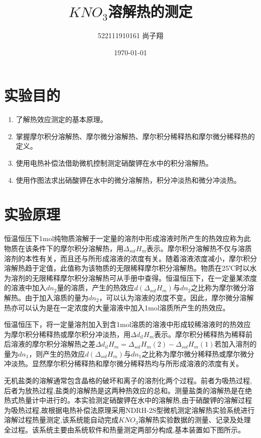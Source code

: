 \documentclass[UTF8]{ctexart}
\title{$KNO_3$溶解热的测定}
\author{522111910161 尚子翔}
\date{\today}
\begin{document}
\fancyhead[L]{}
\fancyfoot[R]{\thepage}

\maketitle
\tableofcontents
\newpage

\section{实验目的}
\begin{enumerate}
    \item 了解热效应测定的基本原理。 
    \item 掌握摩尔积分溶解热、摩尔微分溶解热、摩尔积分稀释热和摩尔微分稀释热的定义。
    \item 使用电热补偿法借助微机控制测定硝酸钾在水中的积分溶解热。
    \item 使用作图法求出硝酸钾在水中的微分溶解热，积分冲淡热和微分冲淡热。
\end{enumerate}



\section{实验原理}
恒温恒压下1mol纯物质溶解于一定量的溶剂中形成溶液时所产生的热效应称为此物质在该条件下的摩尔积分溶解热，用$\Delta_{sol}H_m$表示。摩尔积分溶解热不仅与溶质溶剂的本性有关，而且还与所形成溶液的浓度有关。随着溶液浓度减小，摩尔积分溶解热趋于定值，此值称为该物质的无限稀释摩尔积分溶解热。物质在25℃时以水为溶剂的无限稀释摩尔积分溶解热可从手册中查得。恒温恒压下，在一定量某浓度的溶液中加入$dn_2$量的溶质，产生的热效应$d(\Delta_{sol}H_m)$与$dn_2$之比称为摩尔微分溶解热。由于加入溶质的量为$dn_2$，可以认为溶液的浓度不变。因此，摩尔微分溶解热亦可以认为是在一定浓度的大量溶液中加入1mol溶质所产生的热效应。

恒温恒压下，将一定量溶剂加入到含1mol溶质的溶液中形成较稀溶液时的热效应为摩尔积分稀释热或摩尔积分冲淡热，用$\Delta d_{il}H_m$表示。摩尔积分稀释热为稀释前后溶液的摩尔积分溶解热之差$\Delta d_{il}H_m=\Delta_{sol}H_m(2)-\Delta_{sol}H_m(1)$若加入溶剂的量为$dn_1$，则产生的热效应$d(\Delta_{sol}H_m)$与$dn_1$之比称为摩尔微分稀释热或摩尔微分冲淡热。显然摩尔积分稀释热和摩尔微分稀释热均与所形成溶液的浓度有关。

无机盐类的溶解通常包含晶格的破坏和离子的溶剂化两个过程。前者为吸热过程,后者为放热过程,盐类的溶解热是这两种热效应的总和。测量盐类的溶解热是在绝热式热量计中进行的。本实验测定硝酸钾在水中的溶解热,由于硝酸钾的溶解过程为吸热过程,故根据电热补偿法原理采用NDRH-2S型微机测定溶解热实验系统进行溶解过程热量测定,该系统能自动完成$KNO_3$溶解热实验数据的测量、记录及处理全过程。该系统主要由系统软件和热量测定两部分构成,基本装置如下图所示。
\end{document}
